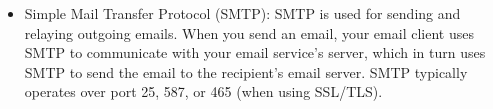 

\begin{issues}
\issueDraft
\end{issues}

\begin{itemize}
\item Simple Mail Transfer Protocol (SMTP): SMTP is used for sending and relaying outgoing emails. When you send an email, your email client uses SMTP to communicate with your email service's server, which in turn uses SMTP to send the email to the recipient's email server. SMTP typically operates over port 25, 587, or 465 (when using SSL/TLS).
\end{itemize}
